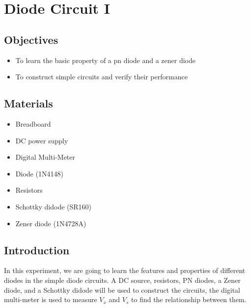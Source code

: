 \chapter{Diode Circuit I}


\section{Objectives}
\begin{itemize}
    \item To learn the basic property of a pn diode and a zener diode
    \item To construct simple circuits and verify their performance
\end{itemize}

\section{Materials}
\begin{itemize}
    \item Breadboard
    \item DC power supply
    \item Digital Multi-Meter
    \item Diode (1N4148)
    \item Resistors
    \item Schottky didode (SR160)
    \item Zener diode (1N4728A)
\end{itemize}

\section{Introduction}
In this experiment, we are going to learn the features and properties of different diodes in the simple diode circuits. A DC source, resistors, PN diodes, a Zener diode, and a Schottky didode will be used to construct the circuits, the digital multi-meter is used to measure $V_x$ and $V_s$ to find the relationship between them.\par
